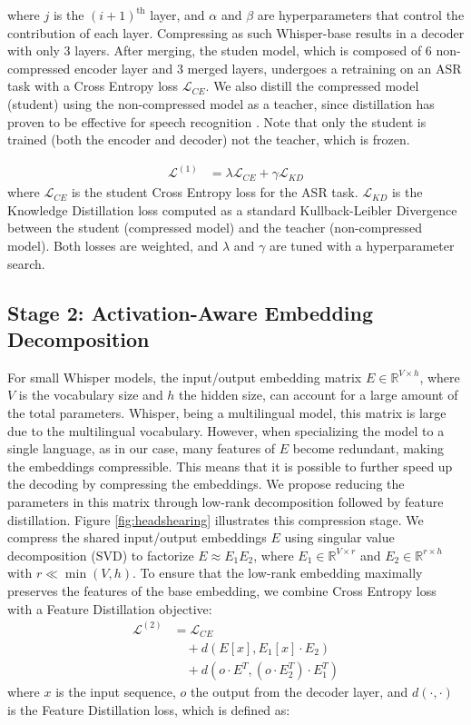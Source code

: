 \documentclass{article}
\begin{document}
{where $j$ is the $(i+1)^\text{th}$ layer, and $\alpha$ and $\beta$ are hyperparameters that control the contribution of each layer. Compressing as such Whisper-base results in a decoder with only 3 layers.
After merging, the studen model, which is composed of 6 non-compressed encoder layer and 3 merged layers, undergoes a retraining on an ASR task with a Cross Entropy loss $\mathcal{L}_{CE}$. We also distill the compressed model (student) using the non-compressed model as a teacher, since distillation has proven to be effective for speech recognition \cite{distillation, distill-whisper}. Note that only the student is trained (both the encoder and decoder) not the teacher, which is frozen.

\begin{align}
    \label{eq:hs}
    \mathcal{L}^{(1)} &= \lambda \mathcal{L}_{CE} + \gamma \mathcal{L}_{KD}
\end{align}
where $\mathcal{L}_{CE}$ is the student Cross Entropy loss for the ASR task. $\mathcal{L}_{KD}$ is the Knowledge Distillation loss computed as a standard Kullback-Leibler Divergence between the student (compressed model) and the teacher (non-compressed model).
Both losses are weighted, and $\lambda$ and $\gamma$ are tuned with a hyperparameter search.

\subsection{Stage 2: Activation-Aware Embedding Decomposition}
For small Whisper models, the input/output embedding matrix $E \in \mathbb{R}^{V \times h}$, where $V$ is the vocabulary size and $h$ the hidden size, can account for a large amount of the total parameters. Whisper, being a multilingual model, this matrix is large due to the multilingual vocabulary. However, when specializing the model to a single language, as in our case, many features of $E$ become redundant, making the embeddings compressible. This means that it is possible to further speed up the decoding by compressing the embeddings. We propose reducing the parameters in this matrix through low-rank decomposition followed by feature distillation. Figure \ref{fig:headshearing} illustrates this compression stage. We compress the shared input/output embeddings $E$ using singular value decomposition (SVD) to factorize $E \approx E_{1}E_{2}$, where $E_{1}\in\mathbb{R}^{V \times r}$ and $E_{2}\in\mathbb{R}^{r \times h}$ with $r \ll \min(V,h)$. To ensure that the low-rank embedding maximally preserves the features of the base embedding, we combine Cross Entropy loss with a Feature Distillation objective:
\begin{align}
    \label{eq:distill}
    \mathcal{L}^{(2)} &= \mathcal{L}_{CE} \nonumber \\
    &\quad + d(E[x], E_{1}[x] \cdot E_{2}) \nonumber \\
    &\quad + d(o\cdot E^{T}, (o \cdot E_{2}^{T}) \cdot E_{1}^{T})
\end{align}
where $x$ is the input sequence, $o$ the output from the decoder layer, and $d(\cdot,\cdot)$ is the Feature Distillation loss, which is defined as:

}
\end{document}
